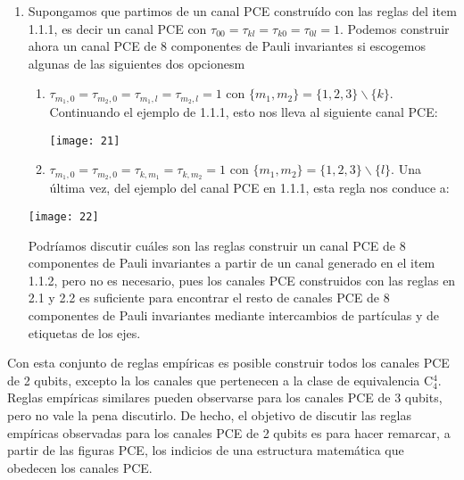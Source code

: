 \begin{enumerate}
	\item Supongamos que partimos de un canal PCE construído con las reglas 
	del item 1.1.1, es decir un canal PCE con 
	$\tau_{00}=\tau_{kl}=\tau_{k0}=\tau_{0l}=1$.
	Podemos construir ahora un canal PCE de 8 componentes de Pauli invariantes si 
	escogemos algunas de las siguientes dos opcionesm
	\begin{enumerate}	
	\item $\tau_{m_1,0}=\tau_{m_2,0}=\tau_{m_1,l}=\tau_{m_2,l}=1$
	con $\{m_1,m_2\}= \{1,2,3 \}\backslash\{k \}$. Continuando el ejemplo de 1.1.1, 
	esto nos lleva al siguiente canal PCE:
	\begin{center}
				\texttt{[image: 21]}
			\end{center}
	\item $\tau_{m_1,0}=\tau_{m_2,0}=\tau_{k,m_1}=\tau_{k,m_2}=1$
	con $\{m_1,m_2\}=\{1,2,3 \}\backslash\{l \}$. Una última vez, del ejemplo 
	del canal PCE en 1.1.1, esta regla nos conduce a:
	\end{enumerate}
	\begin{center}
			\texttt{[image: 22]}
	\end{center}
	Podríamos discutir cuáles son las reglas construir un canal PCE de 8 componentes 
	de Pauli invariantes a partir de un canal generado en el item 1.1.2, pero no es 
	necesario, pues los canales PCE construidos con las reglas en 2.1 y 2.2 es 
	suficiente para encontrar el resto de canales PCE de 8 componentes de Pauli 
	invariantes mediante intercambios de partículas y de etiquetas de los ejes.
\end{enumerate}
Con esta conjunto de reglas empíricas es posible construir todos
los canales PCE de 2 qubits, excepto la los canales que pertenecen
a la clase de equivalencia C${}_4^4$. Reglas empíricas similares pueden 
observarse para los canales PCE de 3 qubits, pero no vale la pena discutirlo.
De hecho, el objetivo de discutir las reglas empíricas observadas para los 
canales PCE de 2 qubits es para hacer remarcar, a partir de las figuras PCE,
los indicios de una estructura matemática que obedecen los canales PCE. 

